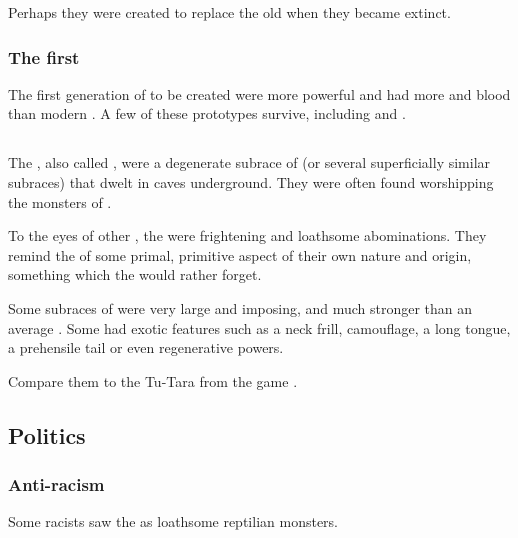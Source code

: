 Perhaps they were created to replace the old  when they became extinct. 





\subsubsection{The first \scathae}
The first generation of \scathae{} to be created were more powerful and had more \draconian{} and \xsic{} blood than modern \scathae. A few of these prototypes survive, including  and . 









\subsection{\Tsutoras}
\index{\tsutora}
\index{\troglodyte}
The \tsutoras, also called \troglodytes, were a degenerate subrace of \demiscathae (or several superficially similar subraces) that dwelt in caves underground. 
They were often found worshipping the \daemonic{} monsters of . 

To the eyes of other \scathae, the \troglodytes{} were frightening and loathsome abominations. 
They remind the \scathae of some primal, primitive aspect of their own nature and origin, something which the \scathae would rather forget. 

Some subraces of \tsutoras were very large and imposing, and much stronger than an average \scatha. 
Some \tsutoras had exotic features such as a neck frill, camouflage, a long tongue, a prehensile tail or even regenerative powers. 

Compare them to the Tu-Tara from the game \cite{VideoGame:Torchlight}. 









\subsection{Politics}





\subsubsection{Anti-\scatha racism}
Some \human racists saw the \scathae as loathsome reptilian monsters. 

